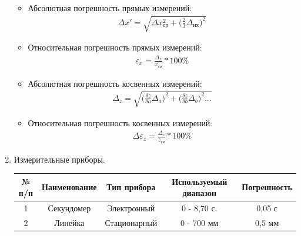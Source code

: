 \documentclass[12pt]{article}
\begin{document}
\begin{enumerate}[label=\arabic*)]
\begin{itemize}
                
                \item Абсолютная погрешность прямых измерений:
                \begin{gather} 
                    \Delta x' = \sqrt{\Delta x_{\text{ср}}^2 + \Big(\frac{2}{3} \Delta_{\text{их}}\Big)^2}
                \end{gather}
                
                \item Относительная погрешность прямых измерений:
                \begin{gather} 
                    \varepsilon_x = \frac{\Delta_x}{x_{\text{ср}}} * 100\%
                \end{gather}
                
                \item Абсолютная погрешность косвенных измерений:
                \begin{gather} 
                    \Delta_z = \sqrt{\Big(\frac{\delta z}{\delta a} \Delta_a\Big)^2 + \Big(\frac{\delta z}{\delta b}\Delta_b\Big)^2 ...}
                \end{gather}
                
                \item Относительная погрешность косвенных измерений:
                \begin{gather} 
                    \Delta\varepsilon_z = \frac{\Delta_z}{z_{\text{ср}}} * 100\%
                \end{gather}
                
                
                
                
        \end{itemize}
        
        
        \item Измерительные приборы.
        \begin{table}[H]
        \centering
                \begin{tabular}{|c|c|c|c|c|}
                \hline
                № п/п & Наименование & Тип прибора & Используемый диапазон & Погрешность\\
                \hline
                1 & Секундомер & Электронный & 0 - 8,70 с.& 0,05 с\\
                \hline
                2 & Линейка & Стационарный & 0 - 700 мм & 0,5 мм\\
                \hline
                \end{tabular}
        \end{table}
        

\end{enumerate}
\end{document}
